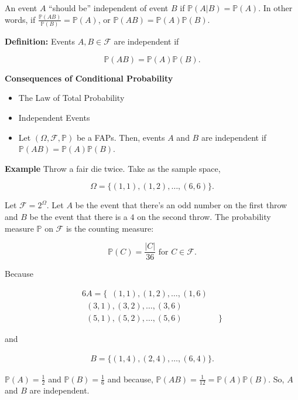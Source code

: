\documentclass[12pt]{article}
\newcommand{\prob}[1]{\mathbb{P}(#1)}
\begin{document}
\vspace*{.3cm}
\noindent
An event $A$ ``should be'' independent of event $B$ if $\prob{A \lvert B} = \prob{A}$. In other words, if $\frac{\prob{AB}}{\prob{B}} = \prob{A}$, or $\prob{AB} = \prob{A} \prob{B}$.

\vspace*{.5cm}
\noindent
\textbf{Definition:} Events $A,B \in \mathcal{F}$ are independent if 

\begin{equation*}
\prob{AB} = \prob{A} \prob{B}.
\end{equation*}

\vspace*{.5cm}
\noindent
\textbf{Consequences of Conditional Probability}

\begin{itemize}
\item The Law of Total Probability
\item Independent Events
\item Let $(\Omega, \mathcal{F}, \mathbb{P})$ be a FAPs. Then, events $A$ and $B$ are independent if $\prob{AB}=\prob{A}\prob{B}$.
\end{itemize}

\begin{tcolorbox}
\textbf{Example} Throw a fair die twice. Take as the sample space,

\begin{equation*}
\Omega = \big \{ (1,1), (1,2), \ldots, (6,6) \big \}.
\end{equation*}

\noindent
Let $\mathcal{F}=2^{\Omega}$. Let $A$ be the event that there's an odd number on the first throw and $B$ be the event that there is a $4$ on the second throw. The probability measure $\mathbb{P}$ on $\mathcal{F}$ is the counting measure:

\begin{equation*}
\prob{C} = \frac{\lvert C \rvert}{36} \text{ for } C \in \mathcal{F}.
\end{equation*}

Because 

\begin{alignat*}{6}
A = \big \{ \enspace (1,1), (1,2), \ldots, (1,6) & \\
 	       \enspace (3,1), (3,2), \ldots, (3,6) & \\
          \enspace (5,1), (5,2), \ldots, (5,6) & \enspace \big \}
\end{alignat*}

and 

\begin{align*}
B = \big \{ (1,4), (2,4), \ldots, (6,4) \big \}.
\end{align*}

$\prob{A} = \frac{1}{2}$ and $\prob{B} = \frac{1}{6}$ and because, $\prob{AB} = \frac{1}{12} = \prob{A}\prob{B}$. So, $A$ and $B$ are independent.
\end{tcolorbox}
\end{document}
